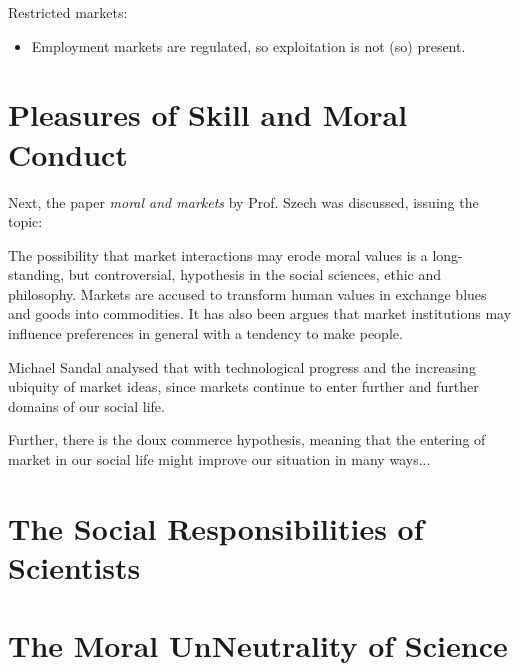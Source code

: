 Restricted markets:

\begin{itemize}
	\item Employment markets are regulated, so exploitation is not (so) present.
\end{itemize}

\section{Pleasures of Skill and Moral Conduct}


Next, the paper \textit{moral and markets} by Prof. Szech was discussed, issuing the topic:


The possibility that market interactions may erode moral values is a long-standing, but controversial, hypothesis in the social sciences, ethic and philosophy. Markets are accused to transform human values in exchange blues and goods into commodities. It has also been argues that market institutions may influence preferences in general with a tendency to make people.

Michael Sandal analysed that with technological progress and the increasing ubiquity of market ideas, since markets continue to enter further and further domains of our social life.


Further, there is the doux commerce hypothesis, meaning that the entering of market in our social life might improve our situation in many ways...


\section{The Social Responsibilities of Scientists}
\section{The Moral UnNeutrality of Science}

